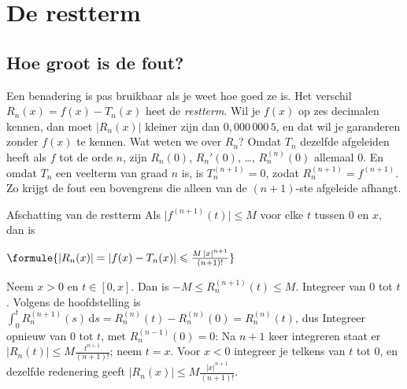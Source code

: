 \begin{oefeningen}
\end{oefeningen}

\section{De restterm}

\subsection{Hoe groot is de fout?}

Een benadering is pas bruikbaar als je weet hoe goed ze is. Het verschil $R_n(x) = f(x) - T_n(x)$ heet de \textit{restterm}. Wil je $f(x)$ op zes decimalen kennen, dan moet $|R_n(x)|$ kleiner zijn dan $0{,}000\,000\,5$, en dat wil je garanderen zonder $f(x)$ te kennen. Wat weten we over $R_n$? Omdat $T_n$ dezelfde afgeleiden heeft als $f$ tot de orde $n$, zijn $R_n(0)$, $R_n'(0)$, \ldots, $R_n^{(n)}(0)$ allemaal 0. En omdat $T_n$ een veelterm van graad $n$ is, is $T_n^{(n+1)} = 0$, zodat $R_n^{(n+1)} = f^{(n+1)}$. Zo krijgt de fout een bovengrens die alleen van de $(n+1)$-ste afgeleide afhangt.

\begin{theorie}
\begin{stelling}{Afschatting van de restterm}
Als $\bigl|f^{(n+1)}(t)\bigr| \leqslant M$ voor elke $t$ tussen 0 en $x$, dan is

\vspace{1mm}
\qquad $\formule{|R_n(x)| = |f(x) - T_n(x)| \leqslant \frac{M\,|x|^{n+1}}{(n+1)!}}$
\end{stelling}

\begin{bewijs}
Neem $x > 0$ en $t \in [0, x]$. Dan is $-M \leqslant R_n^{(n+1)}(t) \leqslant M$. Integreer van 0 tot $t$. Volgens de hoofdstelling is $\int_0^t R_n^{(n+1)}(s)\,\mathrm{d}s = R_n^{(n)}(t) - R_n^{(n)}(0) = R_n^{(n)}(t)$, dus
Integreer opnieuw van 0 tot $t$, met $R_n^{(n-1)}(0) = 0$:
Na $n + 1$ keer integreren staat er $|R_n(t)| \leqslant M \tfrac{t^{n+1}}{(n+1)!}$; neem $t = x$. Voor $x < 0$ integreer je telkens van $t$ tot 0, en dezelfde redenering geeft $|R_n(x)| \leqslant M \tfrac{|x|^{n+1}}{(n+1)!}$.
\end{bewijs}
\end{theorie}


